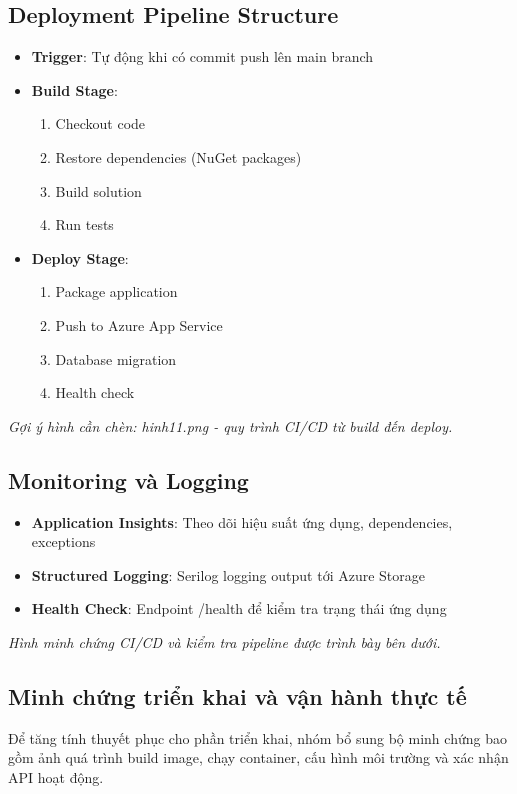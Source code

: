\documentclass[a4paper]{article}
\begin{document}
    \subsection{Deployment Pipeline Structure}
    \begin{itemize}
        \item \textbf{Trigger}: Tự động khi có commit push lên main branch
        \item \textbf{Build Stage}:
        \begin{enumerate}
            \item Checkout code
            \item Restore dependencies (NuGet packages)
            \item Build solution
            \item Run tests
        \end{enumerate}
        \item \textbf{Deploy Stage}:
        \begin{enumerate}
            \item Package application
            \item Push to Azure App Service
            \item Database migration
            \item Health check
        \end{enumerate}
    \end{itemize}

    \textit{Gợi ý hình cần chèn: hinh11.png - quy trình CI/CD từ build đến deploy.}

    \subsection{Monitoring và Logging}
    \begin{itemize}
        \item \textbf{Application Insights}: Theo dõi hiệu suất ứng dụng, dependencies, exceptions
        \item \textbf{Structured Logging}: Serilog logging output tới Azure Storage
        \item \textbf{Health Check}: Endpoint /health để kiểm tra trạng thái ứng dụng
    \end{itemize}

    \textit{Hình minh chứng CI/CD và kiểm tra pipeline được trình bày bên dưới.}

    \subsection{Minh chứng triển khai và vận hành thực tế}
    Để tăng tính thuyết phục cho phần triển khai, nhóm bổ sung bộ minh chứng bao gồm ảnh quá trình build image, chạy container, cấu hình môi trường và xác nhận API hoạt động.
\end{document}
